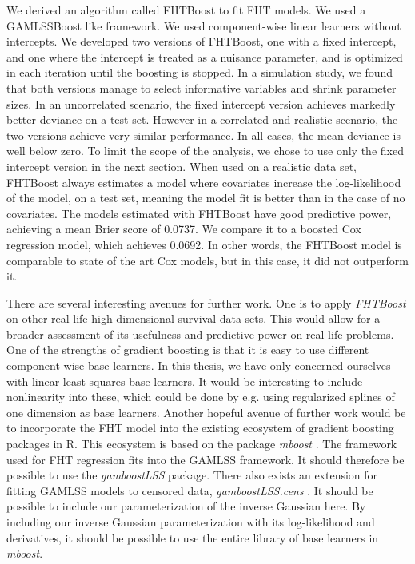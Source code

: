 We derived an algorithm called FHTBoost to fit FHT models.
We used a GAMLSSBoost like framework.
We used component-wise linear learners without intercepts.
We developed two versions of FHTBoost, one with a fixed intercept, and one where the intercept is treated as a nuisance parameter, and is optimized in each iteration until the boosting is stopped.
In a simulation study, we found that both versions manage to select informative variables and shrink parameter sizes.
In an uncorrelated scenario, the fixed intercept version achieves markedly better deviance on a test set.
However in a correlated and realistic scenario, the two versions achieve very similar performance.
In all cases, the mean deviance is well below zero.
To limit the scope of the analysis, we chose to use only the fixed intercept version in the next section.
When used on a realistic data set, FHTBoost always estimates a model where covariates increase the log-likelihood of the model, on a test set, meaning the model fit is better than in the case of no covariates.
The models estimated with FHTBoost have good predictive power, achieving a mean Brier score of 0.0737.
We compare it to a boosted Cox regression model, which achieves 0.0692.
In other words, the FHTBoost model is comparable to state of the art Cox models, but in this case, it did not outperform it.

There are several interesting avenues for further work.
One is to apply \textit{FHTBoost} on other real-life high-dimensional survival data sets.
This would allow for a broader assessment of its usefulness and predictive power on real-life problems.
One of the strengths of gradient boosting is that it is easy to use different component-wise base learners.
In this thesis, we have only concerned ourselves with linear least squares base learners.
It would be interesting to include nonlinearity into these, which could be done by e.g. using regularized splines of one dimension as base learners.
Another hopeful avenue of further work would be to incorporate the FHT model into the existing ecosystem of gradient boosting packages in R.
This ecosystem is based on the package \textit{mboost} \citep{mboost}.
The framework used for FHT regression fits into the GAMLSS framework.
It should therefore be possible to use the \textit{gamboostLSS} \citep{gamboostlss-paper, gamboostLSS-manual} package.
There also exists an extension for fitting GAMLSS models to censored data, \textit{gamboostLSS.cens} \citep{gamlsscens}.
It should be possible to include our parameterization of the inverse Gaussian here.
By including our inverse Gaussian parameterization with its log-likelihood and derivatives, it should be possible to use the entire library of base learners in \textit{mboost}.
